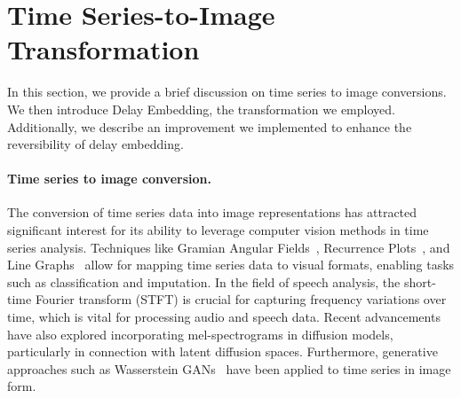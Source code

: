 \documentclass{article}
\theoremstyle{plain}
\theoremstyle{definition}
\theoremstyle{remark}
\begin{document}
{%
\clearpage
\appendix
\onecolumn

\section{Time Series-to-Image Transformation}
\label{app:ts2img}
In this section, we provide a brief discussion on time series to image conversions. We then introduce Delay Embedding, the transformation we employed. Additionally, we describe an improvement we implemented to enhance the reversibility of delay embedding.

\paragraph{Time series to image conversion.} The conversion of time series data into image representations has attracted significant interest for its ability to leverage computer vision methods in time series analysis. Techniques like Gramian Angular Fields~\cite{wang2015imaging}, Recurrence Plots~\cite{hatami2018classification}, and Line Graphs~\cite{li2024time} allow for mapping time series data to visual formats, enabling tasks such as classification and imputation. In the field of speech analysis, the short-time Fourier transform (STFT) \cite{allen1977short, allen1977unified, vetterli1992wavelets, flandrin2004empirical} is crucial for capturing frequency variations over time, which is vital for processing audio and speech data. Recent advancements have also explored incorporating mel-spectrograms in diffusion models, particularly in connection with latent diffusion spaces\cite{popov2021grad, chen2022resgrad, liu2023audioldm}. Furthermore, generative approaches such as Wasserstein GANs~\cite{brophy2019quick, hellermann2021leveraging} have been applied to time series in image form.


}
\end{document}
